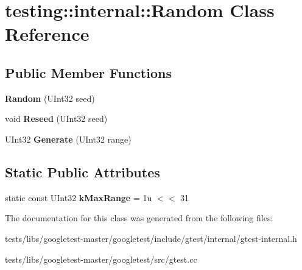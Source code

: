 \hypertarget{classtesting_1_1internal_1_1Random}{}\section{testing\+:\+:internal\+:\+:Random Class Reference}
\label{classtesting_1_1internal_1_1Random}
\subsection*{Public Member Functions}
\begin{DoxyCompactItemize}
\item 
\mbox{\label{classtesting_1_1internal_1_1Random_a6e112be5e7cce00551f6383025f69460}} 
{\bfseries Random} (U\+Int32 seed)
\item 
\mbox{\label{classtesting_1_1internal_1_1Random_adf2f24199318a46f885c78f50d89a69e}} 
void {\bfseries Reseed} (U\+Int32 seed)
\item 
\mbox{\label{classtesting_1_1internal_1_1Random_a9315b7fb621cbcfdf92ed4b5e584c0db}} 
U\+Int32 {\bfseries Generate} (U\+Int32 range)
\end{DoxyCompactItemize}
\subsection*{Static Public Attributes}
\begin{DoxyCompactItemize}
\item 
\mbox{\label{classtesting_1_1internal_1_1Random_a36d72dd7063d0b5338f229e75382fdd2}} 
static const U\+Int32 {\bfseries k\+Max\+Range} = 1u $<$$<$ 31
\end{DoxyCompactItemize}


The documentation for this class was generated from the following files\+:\begin{DoxyCompactItemize}
\item 
tests/libs/googletest-\/master/googletest/include/gtest/internal/gtest-\/internal.\+h\item 
tests/libs/googletest-\/master/googletest/src/gtest.\+cc\end{DoxyCompactItemize}
